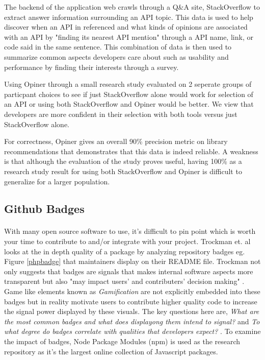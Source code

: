 \documentclass[12pt]{article}
\begin{document}
The backend of the application web crawls through a Q\&A site, StackOverflow \cite{stackoverflow} to extract answer
information surrounding an API topic. This data is used to help discover when an API in referenced and what kinds of opinions
are associated with an API by "finding its nearest API mention" \cite{opinerarticle} through a API name, link, or code said in the same sentence. 
This combination of data is then used to summarize common aspects developers care about such as usability and performance 
by finding their interests through a survey.

Using Opiner \cite{opiner} through a small research study evaluated on 2 seperate groups of particpant choices to see if 
just StackOverflow \cite{stackoverflow} alone would work for selection of an API or using both StackOverflow and Opiner would be better.
We view that developers are more confident in their selection with both tools versus just StackOverflow alone. 

For correctness, Opiner gives an overall 90\% precision metric on library recommendations that demonstrates that this data is indeed reliable.
A weakness is that although the evaluation of the study proves useful, having 100\% as a research study result for using both StackOverflow and Opiner
is difficult to generalize for a larger population. 

\subsection{Github Badges}
\paragraph{}
With many open source software to use, it's difficult to pin point which is worth your time to contribute to and/or integrate with your project.
Trockman et. al \cite{githubbadges} looks at the in depth quality of a package by analyzing repository badges 
eg. Figure \ref{phpbadge} that maintainers display on their README file.
Trockman not only suggests that badges are signals that makes internal software aspects more transparent 
but also "may impact users' and contributers' decision making" \cite{githubbadges}.
Game like elements known as \textit{Gamification} are not explicitly embedded into these badges 
but in reality motivate users to contribute higher quality code to increase the signal power displayed by these visuals. 
The key questions here are, \textit{What are the most common badges and what does displayong them intend to signal?} and 
\textit{To what degree do badges correlate with qualities that developers expect?} \cite{githubbadges}.
To examine the impact of badges, Node Package Modules (npm) \cite{npm} is used as the research repository 
as it's the largest online collection of Javascript packages. 
\end{document}

